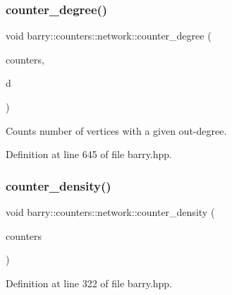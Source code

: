 \subsubsection{\texorpdfstring{counter\+\_\+degree()}{counter\_degree()}}
{\footnotesize\ttfamily void barry\+::counters\+::network\+::counter\+\_\+degree (\begin{DoxyParamCaption}\item[{\hyperlink{namespacebarry_1_1counters_1_1network_a3b3c590303d47840d1967372ae495d95}{Net\+Counter\+Vector} $\ast$}]{counters,  }\item[{std\+::vector$<$ \hyperlink{namespacebarry_a11dfc53ddb4672278319aa04f1e09a6c}{uint} $>$}]{d }\end{DoxyParamCaption})\hspace{0.3cm}{\ttfamily [inline]}}



Counts number of vertices with a given out-\/degree. 



Definition at line 645 of file barry.\+hpp.

\mbox{\label{namespacebarry_1_1counters_1_1network_a313ba439c81c589759cbbc613d12e80b}} 
\subsubsection{\texorpdfstring{counter\+\_\+density()}{counter\_density()}}
{\footnotesize\ttfamily void barry\+::counters\+::network\+::counter\+\_\+density (\begin{DoxyParamCaption}\item[{\hyperlink{namespacebarry_1_1counters_1_1network_a3b3c590303d47840d1967372ae495d95}{Net\+Counter\+Vector} $\ast$}]{counters }\end{DoxyParamCaption})\hspace{0.3cm}{\ttfamily [inline]}}



Definition at line 322 of file barry.\+hpp.

\mbox{\label{namespacebarry_1_1counters_1_1network_af8f024a17f6c518aef79c2cf670e49f5}} 
